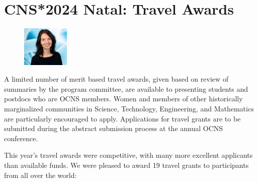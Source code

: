\section*{CNS*2024 Natal: Travel Awards}%
\begin{figure}
  \includegraphics[width=0.2\textwidth]{images/Moerel}
\end{figure}

\noindent{}A limited number of merit based travel awards, given based on review of summaries by the program committee, are available to presenting students and postdocs who are OCNS members. Women and members of other historically marginalized communities in Science, Technology, Engineering, and Mathematics are particularly encouraged to apply.
Applications for travel grants are to be submitted during the abstract submission process at the annual OCNS conference.

This year's travel awards were competitive, with many more excellent applicants than available funds.
We were pleased to award 19 travel grants to participants from all over the world:

